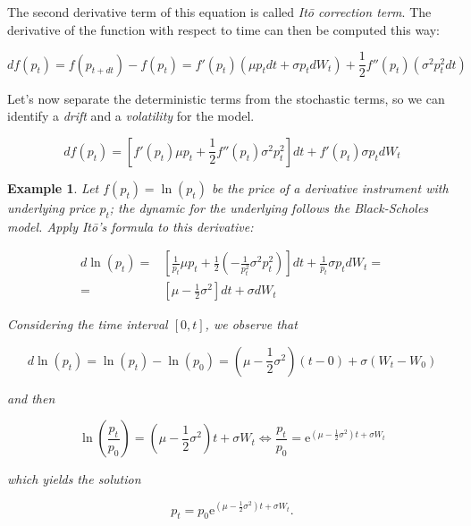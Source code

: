 \documentclass[oneside,titlepage,headinclude,12pt,a4paper,BCOR5mm,footinclude]{book}
\theoremstyle{defn}
\newtheorem{example}{Example}
\begin{document}
  The second derivative term of this equation is called \textit{It\=o correction
  term}.  The derivative  of  the function  with  respect to  time  can then  be
  computed this way:

  \[
    df(p_t) = f(p_{t+dt}) - f(p_t) = f'(p_t)(\mu p_t dt + \sigma p_t dW_t) + 
    \frac{1}{2} f''(p_t)(\sigma^2 p_t^2 dt)
  \]
  
  Let's now  separate the deterministic terms  from the stochastic terms,  so we
  can identify a \textit{drift} and a \textit{volatility} for the model.
  
  \[
    df(p_t) = \left[ f'(p_t)\mu p_t + \frac{1}{2}f''(p_t)\sigma^2 p_t^2\right]dt
      + f'(p_t)\sigma p_t dW_t
  \]

  \begin{example}
    Let  $f(p_t) =  \ln(p_t)$  be  the price  of  a  derivative instrument  with
    underlying  price  $p_t$;  the  dynamic   for  the  underlying  follows  the
    Black-Scholes model. Apply It\=o's formula to this derivative:

    \begin{align*}
      d\ln(p_t) = & \left[ \frac{1}{p_t} \mu p_t + \frac{1}{2}\left( 
        -\frac{1}{p_t^2}\sigma^2 p_t^2\right)\right]dt +
        \frac{1}{p_t}\sigma p_t dW_t = \\
        = & \left[\mu - \frac{1}{2} \sigma^2 \right]dt + \sigma dW_t
    \end{align*}

    Considering the time interval $[0,t]$, we observe that
    
    \[
      d\ln(p_t) = \ln(p_t) - \ln(p_0) = \left( \mu - \frac{1}{2}\sigma^2 \right)
        (t-0) + \sigma (W_t - W_0)
    \]
    
    and then
    
    \[
      \ln\left(\frac{p_t}{p_0}\right) = \left(\mu -\frac{1}{2}\sigma^2\right)t + \sigma W_t
      \iff
      \frac{p_t}{p_0} = \mathrm{e}^{\left(\mu - \frac{1}{2}\sigma^2\right)t + \sigma W_t}
    \]
    
    which yields the solution
    
    \[
      p_t = p_0 \mathrm{e}^{\left(\mu - \frac{1}{2}\sigma^2\right)t + \sigma W_t}.
    \]
  \end{example}
\end{document}
